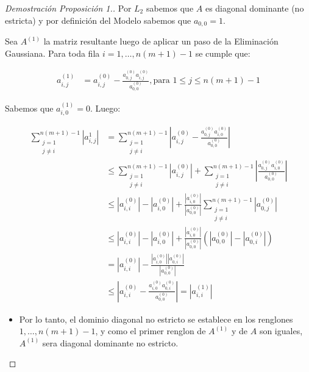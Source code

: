 \begin{proof}[Demostración Proposición 1.]

Por $L_{2}$ sabemos que $A$ es diagonal dominante (no estricta) y por definición del Modelo sabemos que $a_{0,0} = 1$.

Sea $A^{(1)}$ la matriz resultante luego de aplicar un paso de la Eliminación Gaussiana. Para toda fila $i = 1,\dots,n(m+1)-1$ se cumple que:

\begin{equation*}
    \begin{aligned}
      a^{(1)}_{i,j} &= a^{(0)}_{i,j} - \frac{a^{(0)}_{0,j}a^{(0)}_{i,j}}{a^{(0)}_{0,0}}, \text{para } 1 \leq j \leq n(m+1)-1
    \end{aligned}
\end{equation*}

Sabemos que $a^{(1)}_{i,0} = 0$. Luego:

\begin{equation*}
    \begin{aligned}
      \sum\limits_{\substack{j=1  \\ j \neq i}}^{n(m+1)-1} |a^{1}_{i,j}| &= \sum\limits_{\substack{j=1  \\ j \neq i}}^{n(m+1)-1} |a^{(0)}_{i,j} - \frac{a^{(0)}_{0,j}a^{(0)}_{i,0}}{a^{(0)}_{0,0}}| \\
      &\leq \sum\limits_{\substack{j=1  \\ j \neq i}}^{n(m+1)-1} |a^{(0)}_{i,j}| + \sum\limits_{\substack{j=1  \\ j \neq i}}^{n(m+1)-1} |\frac{a^{(0)}_{0,j}a^{(0)}_{i,0}}{a^{(0)}_{0,0}}| \\
      &\leq |a^{(0)}_{i,i}| - |a^{(0)}_{i,0}| +  \frac{|a^{(0)}_{i,0}|}{|a^{(0)}_{0,0}|} \sum\limits_{\substack{j=1  \\ j \neq i}}^{n(m+1)-1} |a^{(0)}_{0,j}| \\
      &\leq |a^{(0)}_{i,i}| - |a^{(0)}_{i,0}| +  \frac{|a^{(0)}_{i,0}|}{|a^{(0)}_{0,0}|} (|a^{(0)}_{0,0}| - |a^{(0)}_{0,i}|) \\
      &= |a^{(0)}_{i,i}| - \frac{|a^{(0)}_{i,0}||a^{(0)}_{0,i}|}{|a^{(0)}_{0,0}|} \\
      &\leq |a^{(0)}_{i,i} - \frac{a^{(0)}_{i,0}a^{(0)}_{0,i}}{a^{(0)}_{0,0}}| = |a^{(1)}_{i,i}|
    \end{aligned}
\end{equation*}

\begin{itemize}
\item Por lo tanto, el dominio diagonal no estricto se establece en los renglones $1,\dots,n(m+1)-1$, y como el primer renglon de $A^{(1)}$ y de $A$ son iguales,
$A^{(1)}$ sera diagonal dominante no estricto.


\end{itemize}
\end{proof}
